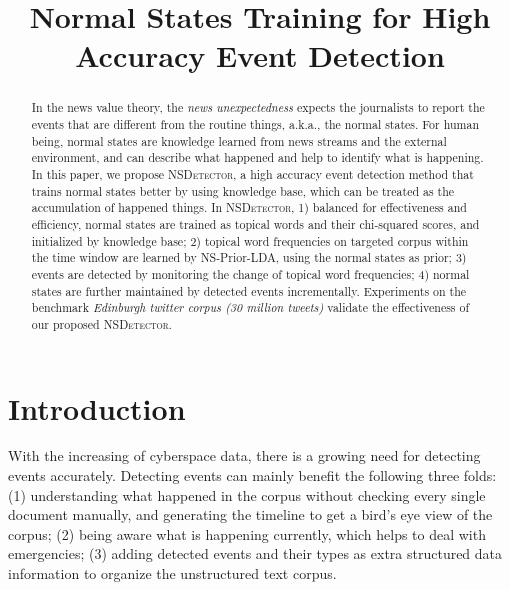 \documentclass[conference,compsoc]{IEEEtran}
\begin{document}
\title{Normal States Training for High Accuracy Event Detection}

\maketitle
\begin{abstract}
In the news value theory, the \textit{news unexpectedness} expects the journalists to report the events that are different from the routine things, a.k.a., the normal states. 
For human being, normal states are knowledge learned from news streams and the external environment, and can describe what happened and help to identify what is happening.
In this paper, we propose \textsc{NSDetector}, a high accuracy event detection method that trains normal states better by using knowledge base, which can be treated as the accumulation of happened things. 
In \textsc{NSDetector}, 1) balanced for effectiveness and efficiency, normal states are trained as topical words and their chi-squared scores, and initialized by knowledge base; 2) topical word frequencies on targeted corpus within the time window are learned by NS-Prior-LDA, using the normal states as prior; 3) events are detected by monitoring the change of topical word frequencies; 4) normal states are further maintained by detected events incrementally.
Experiments on the benchmark \textit{Edinburgh twitter corpus (30 million tweets)} validate the effectiveness of our proposed \textsc{NSDetector}.
\end{abstract}


\section{Introduction}

With the increasing of cyberspace data, there is a growing need for detecting events accurately. Detecting events can mainly benefit the following three folds: (1) understanding what happened in the corpus without checking every single document manually, and generating the timeline to get a bird's eye view of the corpus\cite{ge2015bring}; (2) being aware what is happening currently, which helps to deal with emergencies\cite{hughes2009twitter}\cite{sakaki2010earthquake}; (3) adding detected events and their types as extra structured data information to organize the unstructured text corpus\cite{ritter2012open}.  
\end{document}
